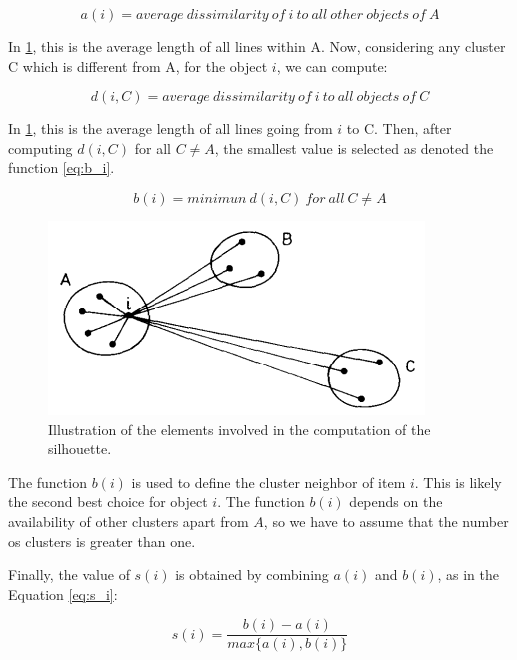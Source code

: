 \documentclass[journal]{IEEEtran}
\begin{document}
	\begin{equation} \label{eq:a_i}
	a(i) = average~dissimilarity~of~i~to~all~other~objects~of~A
	\end{equation}
	
	In \ref{fig:silhouette}, this is the average length of all lines within A. Now, considering any cluster C which is different from A, for the object $i$, we can compute:
	
	\begin{equation} \label{eq:d_i}
	d(i, C) = average~dissimilarity~of~i~to~all~objects~of~C
	\end{equation}
	
	In \ref{fig:silhouette}, this is the average length of all lines going from $i$ to C. Then, after computing $d(i, C)$ for all $C \neq A$, the smallest value is selected as denoted the function \ref{eq:b_i}.
	
	\begin{equation} \label{eq:b_i}
	b(i) = minimun~d(i, C)~for~all~C \neq A
	\end{equation}
	
	\begin{figure}[!htb]
		\centering
		\includegraphics[scale=.6]{figures/silhouette_img.png}
		\caption{Illustration of the elements involved in the computation of the silhouette. \cite{rousseeuw1987silhouettes}}
		\label{fig:silhouette}
	\end{figure}
	
	The function $b(i)$ is used to define the cluster neighbor of item $i$. This is likely the second best choice for object $i$. The function $b(i)$ depends on the availability of other clusters apart from $A$, so we have to assume that the number os clusters is greater than one.
	
	Finally, the value of $s(i)$ is obtained by combining $a(i)$ and $b(i)$, as in the Equation \ref{eq:s_i}:
	
	\begin{equation} \label{eq:s_i}
	s(i) = \frac{b(i) - a(i)}{max\{a(i), b(i)\}}
	\end{equation}
	
\end{document}
